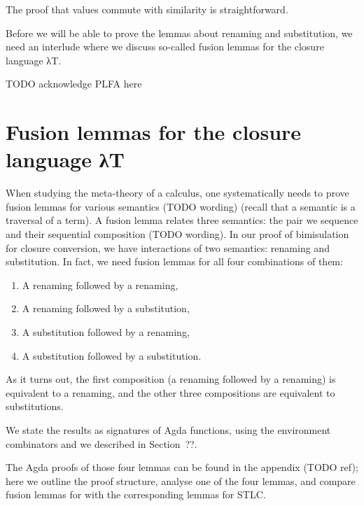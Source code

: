 \documentclass[bsc,frontabs,twoside,singlespacing,parskip,deptreport]{infthesis}
\theoremstyle{definition}
\begin{document}
The proof that values commute with similarity is straightforward.


Before we will be able to prove the lemmas about renaming and substitution, we need an interlude
where we discuss so-called fusion lemmas for the closure language λT.

TODO acknowledge PLFA here


\section{Fusion lemmas for the closure language λT}

When studying the meta-theory of a calculus, one systematically needs
to prove fusion lemmas for various semantics (TODO wording) (recall
that a semantic is a traversal of a term). A fusion
lemma relates three semantics: the pair we sequence and their
sequential composition (TODO wording). In our proof of bimisulation
for closure conversion, we have interactions of two semantics:
renaming and substitution. In fact, we need fusion lemmas for all four
combinations of them:

\begin{enumerate}
  \item A renaming followed by a renaming,
  \item A renaming followed by a substitution,
  \item A substitution followed by a renaming,
  \item A substitution followed by a substitution.
  \end{enumerate}

As it turns out, the first composition (a renaming followed by a
renaming) is equivalent to a renaming, and the other three compositions
are equivalent to substitutions. 

We state the results as signatures of Agda functions, using the
environment combinators \AS{\_<\$>\_} and  we described in Section~??.


The Agda proofs of those four lemmas can be found in the appendix
(TODO ref); here we outline the proof structure, analyse one of the
four lemmas, and compare
fusion lemmas for \lcl with the corresponding lemmas for STLC.
\end{document}
